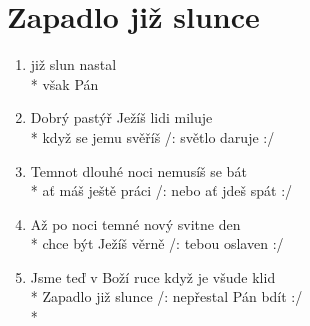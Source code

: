 \section{Zapadlo již slunce}
\begin{enumerate}
\item {} již slun  nastal  \\*
 však    Pán   
\item Dobrý pastýř Ježíš lidi miluje \\*
když se jemu svěříš /: světlo daruje :/ 
\item Temnot dlouhé noci nemusíš se bát \\*
ať máš ještě práci /: nebo ať jdeš spát :/ 
\item Až po noci temné nový svitne den \\*
chce být Ježíš věrně /: tebou oslaven :/ 
\item Jsme teď v Boží ruce když je všude klid \\*
Zapadlo již slunce /: nepřestal Pán bdít :/ \\*
\end{enumerate}
